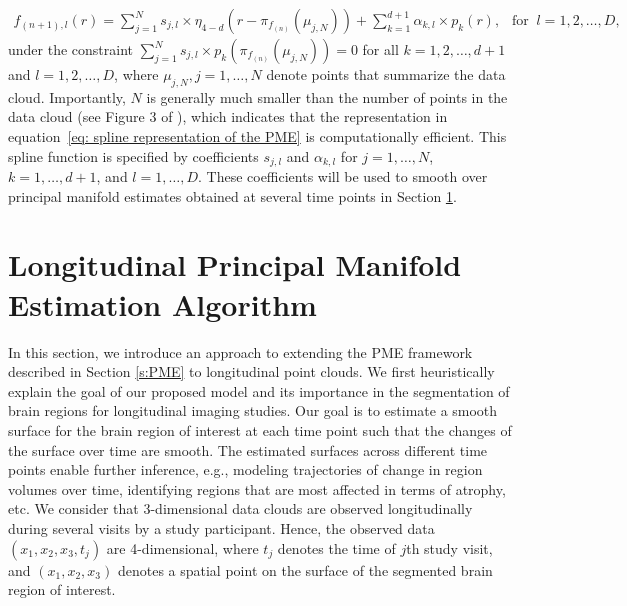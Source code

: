 \documentclass[11pt,reqno]{article}
\theoremstyle{definition}
\begin{document}
\begin{align}\label{eq: spline representation of the PME}
    f_{(n+1), l}(r) = \sum_{j=1}^N s_{j, l} \times \eta_{4-d}\left(r - \pi_{f_{(n)}}(\mu_{j, N})\right) + \sum_{k=1}^{d + 1}\alpha_{k, l} \times p_k(r), \ \ \text{ for } \ l = 1, 2, \dots, D,
\end{align}
under the constraint $\sum_{j=1}^{N}s_{j, l} \times p_{k}\left(\pi_{f_{(n)}}(\mu_{j, N})\right) = 0$ for all $k = 1, 2, \dots, d + 1$ and $l = 1, 2, \dots, D$, where $\mu_{j, N}, j = 1, \dots, N$ denote points that summarize the data cloud. Importantly, $N$ is generally much smaller than the number of points in the data cloud (see Figure 3 of \cite{mengPrincipalManifoldEstimation2021}), which indicates that the representation in equation~\eqref{eq: spline representation of the PME} is computationally efficient. This spline function is specified by coefficients $s_{j, l}$ and $\alpha_{k, l}$ for $j = 1, \dots, N$, $k = 1, \dots, d+1$, and $l = 1, \dots, D$. These coefficients will be used to smooth over principal manifold estimates obtained at several time points in Section \ref{s:LPME}.






\section{Longitudinal Principal Manifold Estimation Algorithm}\label{s:LPME}

In this section, we introduce an approach to extending the PME framework described in Section \ref{s:PME} to longitudinal point clouds. We first heuristically explain the goal of our proposed model and its importance in the segmentation of brain regions for longitudinal imaging studies. Our goal is to estimate a smooth surface for the brain region of interest at each time point such that the changes of the surface over time are smooth. The estimated surfaces across different time points enable further inference, e.g., modeling trajectories of change in region volumes over time, identifying regions that are most affected in terms of atrophy, etc. We consider that 3-dimensional data clouds are observed longitudinally during several visits by a study participant. Hence, the observed data $(x_1, x_2, x_3,t_j)$ are 4-dimensional, where $t_j$ denotes the time of $j$th study visit, and $(x_1, x_2, x_3)$ denotes a spatial point on the surface of the segmented brain region of interest. 
\end{document}
